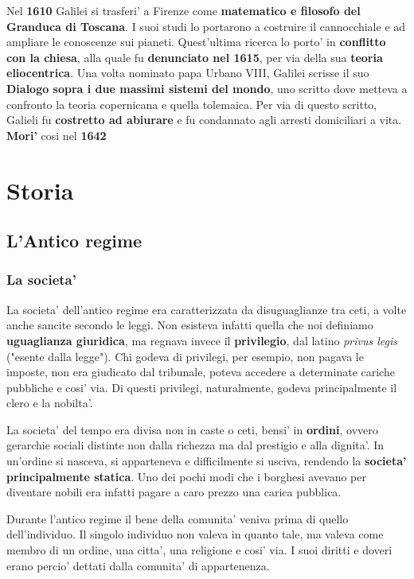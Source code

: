 \documentclass{article}
\begin{document}
{{    Nel \textbf{1610} Galilei si trasferi' a Firenze come \textbf{matematico e filosofo del Granduca di Toscana}. I suoi studi lo portarono a costruire il cannocchiale e ad ampliare le conoscenze sui pianeti. Quest'ultima ricerca lo porto' in \textbf{conflitto con la chiesa}, alla quale fu \textbf{denunciato nel 1615}, per via della sua \textbf{teoria eliocentrica}. Una volta nominato papa Urbano VIII, Galilei scrisse il suo \textbf{Dialogo sopra i due massimi sistemi del mondo}, uno scritto dove metteva a confronto la teoria copernicana e quella tolemaica. Per via di questo scritto, Galieli fu \textbf{costretto ad abiurare} e fu condannato agli arresti domiciliari a vita. \textbf{Mori'} cosi nel \textbf{1642}
 
  }

  \pagebreak
  \section{Storia}
  {
    \subsection{L'Antico regime}
    \subsubsection{La societa'} %
    La societa' dell'antico regime era caratterizzata da disuguaglianze tra ceti, a volte anche sancite secondo le leggi. Non esisteva infatti quella che noi definiamo \textbf{uguaglianza giuridica}, ma regnava invece il \textbf{privilegio}, dal latino \textit{privus legis} \small{("esente dalla legge")}. Chi godeva di privilegi, per esempio, non pagava le imposte, non era giudicato dal tribunale, poteva accedere a determinate cariche pubbliche e cosi' via. Di questi privilegi, naturalmente, godeva principalmente il clero e la nobilta'.

    La societa' del tempo era divisa non in caste o ceti, bensi' in \textbf{ordini}, ovvero gerarchie sociali distinte non dalla richezza ma dal prestigio e alla dignita'. In un'ordine si nasceva, si apparteneva e difficilmente si usciva, rendendo la \textbf{societa' principalmente statica}. Uno dei pochi modi che i borghesi avevano per diventare nobili era infatti pagare a caro prezzo una carica pubblica.

    Durante l'antico regime il bene della comunita' veniva prima di quello dell'individuo. Il singolo individuo non valeva in quanto tale, ma valeva come membro di un ordine, una citta', una religione e cosi' via. I suoi diritti e doveri erano percio' dettati dalla comunita' di appartenenza.

}}
\end{document}
